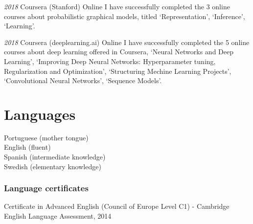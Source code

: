 \documentclass[10pt,letterpaper]{article} %
\begin{document}
    {\em  2018 }
    { Coursera (Stanford) }
    { Online }
    { I have successfully completed the 3 online courses about probabilistic graphical models, titled `Representation', `Inference', `Learning'. }

    {\em  2018 }
    { Coursera (deeplearning.ai) }
    { Online }
    { I have successfully completed the 5 online courses about deep learning offered in Coursera, `Neural Networks and Deep Learning', `Improving Deep Neural Networks: Hyperparameter tuning, Regularization and Optimization', `Structuring Mechine Learning Projects', `Convolutional Neural Networks', `Sequence Models'. }


\section*{Languages}

Portuguese (mother tongue)\\
English (fluent)\\
Spanish (intermediate knowledge)\\
Swedish (elementary knowledge)

\subsubsection*{Language certificates}

Certificate in Advanced English (Council of Europe Level C1) - Cambridge English Language Assessment, 2014
\end{document}
